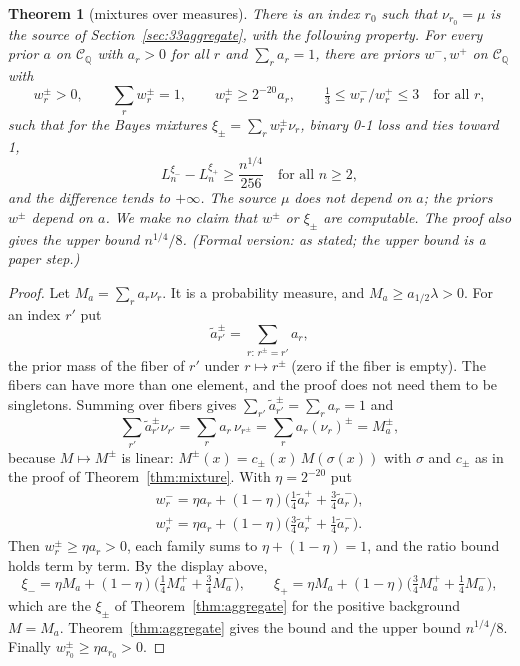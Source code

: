 \documentclass[11pt]{article}
\newcommand{\cCQ}{\mathcal{C}_{\mathbb{Q}}}
\newtheorem{theorem}{Theorem}[section]
\theoremstyle{definition}
\theoremstyle{remark}
\begin{document}
\begin{theorem}[mixtures over measures]\label{thm:measures}
There is an index $r_0$ such that $\nu_{r_0}=\mu$ is the source of
Section~\ref{sec:33aggregate}, with the following property. For every prior $a$ on $\cCQ$ with
$a_r>0$ for all $r$ and $\sum_ra_r=1$, there are priors $w^-,w^+$ on $\cCQ$
with
\[
w^\pm_r>0,\qquad \sum_rw^\pm_r=1,\qquad w^\pm_r\ge2^{-20}a_r,\qquad
\tfrac13\le w^-_r/w^+_r\le3\quad\text{for all }r,
\]
such that for the Bayes mixtures $\xi_\pm=\sum_rw^\pm_r\nu_r$, binary 0-1 loss
and ties toward 1,
\[
L_n^{\xi_-}-L_n^{\xi_+}\ge\frac{n^{1/4}}{256}\quad\text{for all }n\ge2,
\]
and the difference tends to $+\infty$. The source $\mu$ does not depend on
$a$; the priors $w^\pm$ depend on $a$. We make no claim that $w^\pm$ or $\xi_\pm$
are computable. The proof also gives the upper bound $n^{1/4}/8$. (Formal
version: as stated; the upper bound is a paper step.)
\end{theorem}

\begin{proof}
Let $M_a=\sum_ra_r\nu_r$. It is a probability measure, and
$M_a\ge a_{1/2}\lambda>0$. For an index $r'$ put
\[
\tilde a^\pm_{r'}=\sum_{r:\,r^\pm=r'}a_r ,
\]
the prior mass of the fiber of $r'$ under $r\mapsto r^\pm$ (zero if the fiber is
empty). The fibers can have more than one element, and the proof does not need
them to be singletons. Summing over fibers gives
$\sum_{r'}\tilde a^\pm_{r'}=\sum_ra_r=1$ and
\[
\sum_{r'}\tilde a^\pm_{r'}\nu_{r'}=\sum_ra_r\,\nu_{r^\pm}=\sum_ra_r(\nu_r)^\pm=M_a^\pm ,
\]
because $M\mapsto M^\pm$ is linear: $M^\pm(x)=c_\pm(x)\,M(\sigma(x))$ with
$\sigma$ and $c_\pm$ as in the proof of Theorem~\ref{thm:mixture}. With
$\eta=2^{-20}$ put
\begin{gather*}
w^-_r=\eta a_r+(1-\eta)\bigl(\tfrac14\tilde a^+_r+\tfrac34\tilde a^-_r\bigr),\\
w^+_r=\eta a_r+(1-\eta)\bigl(\tfrac34\tilde a^+_r+\tfrac14\tilde a^-_r\bigr).
\end{gather*}
Then $w^\pm_r\ge\eta a_r>0$, each family sums to $\eta+(1-\eta)=1$, and the
ratio bound holds term by term. By the display above,
\[
\xi_-=\eta M_a+(1-\eta)\bigl(\tfrac14M_a^++\tfrac34M_a^-\bigr),\qquad
\xi_+=\eta M_a+(1-\eta)\bigl(\tfrac34M_a^++\tfrac14M_a^-\bigr),
\]
which are the $\xi_\pm$ of Theorem~\ref{thm:aggregate} for the positive
background $M=M_a$. Theorem~\ref{thm:aggregate} gives the bound and the upper
bound $n^{1/4}/8$. Finally $w^\pm_{r_0}\ge\eta a_{r_0}>0$.
\end{proof}
\end{document}
